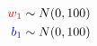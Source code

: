 \documentclass[10pt]{article}
\begin{document}
\begin{align*}\color{red}w_1\color{black} \sim N(0, 100)\\
\color{blue}b_1\color{black} \sim N(0, 100)\end{align*}
\end{document}
